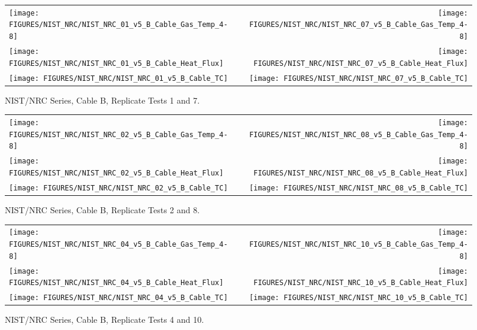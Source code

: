 \begin{figure}[h!]
\begin{tabular*}{\textwidth}{l@{\extracolsep{\fill}}r}
\texttt{[image: FIGURES/NIST\_NRC/NIST\_NRC\_01\_v5\_B\_Cable\_Gas\_Temp\_4-8]} &
\texttt{[image: FIGURES/NIST\_NRC/NIST\_NRC\_07\_v5\_B\_Cable\_Gas\_Temp\_4-8]} \\
\texttt{[image: FIGURES/NIST\_NRC/NIST\_NRC\_01\_v5\_B\_Cable\_Heat\_Flux]} &
\texttt{[image: FIGURES/NIST\_NRC/NIST\_NRC\_07\_v5\_B\_Cable\_Heat\_Flux]} \\
\texttt{[image: FIGURES/NIST\_NRC/NIST\_NRC\_01\_v5\_B\_Cable\_TC]} &
\texttt{[image: FIGURES/NIST\_NRC/NIST\_NRC\_07\_v5\_B\_Cable\_TC]}
\end{tabular*}
\caption{NIST/NRC Series, Cable B, Replicate Tests 1 and 7.}
\label{NIST_NRC_B_1_and_7}
\end{figure}

\begin{figure}[h]
\begin{tabular*}{\textwidth}{l@{\extracolsep{\fill}}r}
\texttt{[image: FIGURES/NIST\_NRC/NIST\_NRC\_02\_v5\_B\_Cable\_Gas\_Temp\_4-8]} &
\texttt{[image: FIGURES/NIST\_NRC/NIST\_NRC\_08\_v5\_B\_Cable\_Gas\_Temp\_4-8]} \\
\texttt{[image: FIGURES/NIST\_NRC/NIST\_NRC\_02\_v5\_B\_Cable\_Heat\_Flux]} &
\texttt{[image: FIGURES/NIST\_NRC/NIST\_NRC\_08\_v5\_B\_Cable\_Heat\_Flux]} \\
\texttt{[image: FIGURES/NIST\_NRC/NIST\_NRC\_02\_v5\_B\_Cable\_TC]} &
\texttt{[image: FIGURES/NIST\_NRC/NIST\_NRC\_08\_v5\_B\_Cable\_TC]}
\end{tabular*}
\caption{NIST/NRC Series, Cable B, Replicate Tests 2 and 8.}
\label{NIST_NRC_B_2_and_8}
\end{figure}

\begin{figure}[h]
\begin{tabular*}{\textwidth}{l@{\extracolsep{\fill}}r}
\texttt{[image: FIGURES/NIST\_NRC/NIST\_NRC\_04\_v5\_B\_Cable\_Gas\_Temp\_4-8]} &
\texttt{[image: FIGURES/NIST\_NRC/NIST\_NRC\_10\_v5\_B\_Cable\_Gas\_Temp\_4-8]} \\
\texttt{[image: FIGURES/NIST\_NRC/NIST\_NRC\_04\_v5\_B\_Cable\_Heat\_Flux]} &
\texttt{[image: FIGURES/NIST\_NRC/NIST\_NRC\_10\_v5\_B\_Cable\_Heat\_Flux]} \\
\texttt{[image: FIGURES/NIST\_NRC/NIST\_NRC\_04\_v5\_B\_Cable\_TC]} &
\texttt{[image: FIGURES/NIST\_NRC/NIST\_NRC\_10\_v5\_B\_Cable\_TC]}
\end{tabular*}
\caption{NIST/NRC Series, Cable B, Replicate Tests 4 and 10.}
\label{NIST_NRC_B_4_and_10}
\end{figure}

